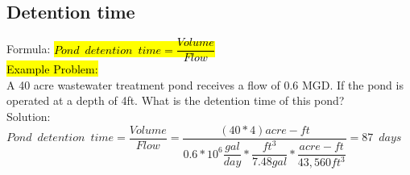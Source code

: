 \subsection{Detention time}
\vspace{0.3cm}
Formula: \hl{$Pond \enspace detention \enspace time=\dfrac{Volume}{Flow}$}\\ 
\vspace{0.3cm}
\hl{Example Problem:}\\
A 40 acre wastewater treatment pond receives a flow of 0.6 MGD. If the pond is operated at a depth of 4ft. What is the detention time of this pond?\\
Solution:\\
$Pond \enspace detention \enspace time=\dfrac{Volume}{Flow}=\dfrac{(40*4)acre-ft}{0.6*10^6\dfrac{gal}{day}*\dfrac{ft^3}{7.48gal}*\dfrac{acre-ft}{43,560ft^3}}=\boxed{87 \enspace days}$\\
\vspace{0.3cm}


